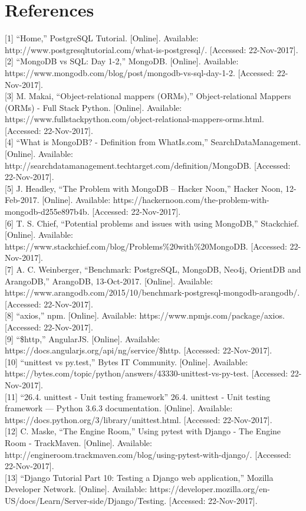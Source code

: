\documentclass[onecolumn, draftclsnofoot,10pt, compsoc]{article}
\begin{document}
\section{References}
	{[1]} “Home,” PostgreSQL Tutorial. [Online]. Available: http://www.postgresqltutorial.com/what-is-postgresql/. [Accessed: 22-Nov-2017].\\
	{[2]} “MongoDB vs SQL: Day 1-2,” MongoDB. [Online]. Available: https://www.mongodb.com/blog/post/mongodb-vs-sql-day-1-2. [Accessed: 22-Nov-2017].\\
	{[3]} M. Makai, “Object-relational mappers (ORMs),” Object-relational Mappers (ORMs) - Full Stack Python. [Online]. Available: https://www.fullstackpython.com/object-relational-mappers-orms.html. [Accessed: 22-Nov-2017].\\
	{[4]} “What is MongoDB? - Definition from WhatIs.com,” SearchDataManagement. [Online]. Available: http://searchdatamanagement.techtarget.com/definition/MongoDB. [Accessed: 22-Nov-2017].\\
	{[5]} J. Headley, “The Problem with MongoDB – Hacker Noon,” Hacker Noon, 12-Feb-2017. [Online]. Available: https://hackernoon.com/the-problem-with-mongodb-d255e897b4b. [Accessed: 22-Nov-2017].\\
	{[6]} T. S. Chief, “Potential problems and issues with using MongoDB,” Stackchief. [Online]. Available: https://www.stackchief.com/blog/Problems\%20with\%20MongoDB. [Accessed: 22-Nov-2017].\\
	{[7]} A. C. Weinberger, “Benchmark: PostgreSQL, MongoDB, Neo4j, OrientDB and ArangoDB,” ArangoDB, 13-Oct-2017. [Online]. Available: https://www.arangodb.com/2015/10/benchmark-postgresql-mongodb-arangodb/. [Accessed: 22-Nov-2017].\\
	{[8]} “axios,” npm. [Online]. Available: https://www.npmjs.com/package/axios. [Accessed: 22-Nov-2017].\\
	{[9]} “\$http,” AngularJS. [Online]. Available: https://docs.angularjs.org/api/ng/service/\$http. [Accessed: 22-Nov-2017].\\
	{[10]} “unittest vs py.test,” Bytes IT Community. [Online]. Available: https://bytes.com/topic/python/answers/43330-unittest-vs-py-test. [Accessed: 22-Nov-2017].\\
	{[11]} “26.4. unittest - Unit testing framework” 26.4. unittest - Unit testing framework — Python 3.6.3 documentation. [Online]. Available: https://docs.python.org/3/library/unittest.html. [Accessed: 22-Nov-2017].\\
	{[12]} C. Maske, “The Engine Room,” Using pytest with Django - The Engine Room - TrackMaven. [Online]. Available: http://engineroom.trackmaven.com/blog/using-pytest-with-django/. [Accessed: 22-Nov-2017].\\
	{[13]} “Django Tutorial Part 10: Testing a Django web application,” Mozilla Developer Network. [Online]. Available: https://developer.mozilla.org/en-US/docs/Learn/Server-side/Django/Testing. [Accessed: 22-Nov-2017].\\
\end{document}
